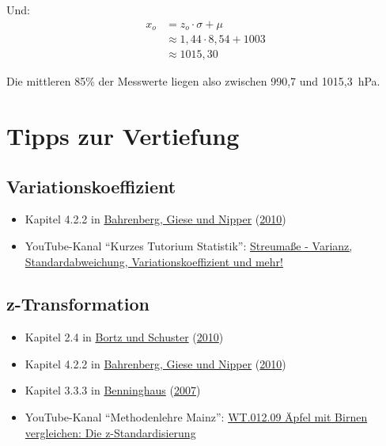 \documentclass[
  11pt,
  ngerman,
  a4paper,
]{report}
\providecommand{\tightlist}{%
  \setlength{\itemsep}{0pt}\setlength{\parskip}{0pt}}
\begin{document}
Und:
\[
  \begin{aligned}
    x_o&=z_o\cdot \sigma + \mu  \\
    &\approx1{,}44 \cdot 8{,}54 + 1003\\
    & \approx 1015{,}30
  \end{aligned}
\]

Die mittleren 85\% der Messwerte liegen also zwischen 990,7 und 1015,3~hPa.

\hypertarget{tipps-zur-vertiefung-2}{%
\section*{Tipps zur Vertiefung}\label{tipps-zur-vertiefung-2}}

\hypertarget{variationskoeffizient-1}{%
\subsection{Variationskoeffizient}\label{variationskoeffizient-1}}

\begin{itemize}
\tightlist
\item
  Kapitel 4.2.2 in \protect\hyperlink{ref-bahrenberg}{Bahrenberg, Giese und Nipper} (\protect\hyperlink{ref-bahrenberg}{2010})
\item
  YouTube-Kanal \enquote{Kurzes Tutorium Statistik}: \href{https://www.youtube.com/watch?v=3oZrS3ZWVcA}{Streumaße - Varianz, Standardabweichung, Variationskoeffizient und mehr!}
\end{itemize}

\hypertarget{z-transformation-1}{%
\subsection{z-Transformation}\label{z-transformation-1}}

\begin{itemize}
\tightlist
\item
  Kapitel 2.4 in \protect\hyperlink{ref-bortz}{Bortz und Schuster} (\protect\hyperlink{ref-bortz}{2010})
\item
  Kapitel 4.2.2 in \protect\hyperlink{ref-bahrenberg}{Bahrenberg, Giese und Nipper} (\protect\hyperlink{ref-bahrenberg}{2010})
\item
  Kapitel 3.3.3 in \protect\hyperlink{ref-benninghaus}{Benninghaus} (\protect\hyperlink{ref-benninghaus}{2007})
\item
  YouTube-Kanal \enquote{Methodenlehre Mainz}: \href{https://www.youtube.com/watch?v=AiucvUlIP8k}{WT.012.09 Äpfel mit Birnen vergleichen: Die z-Standardisierung}
\end{itemize}
\end{document}
